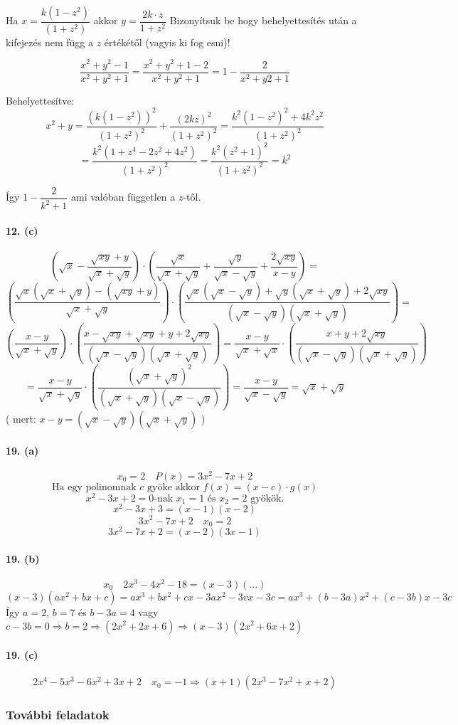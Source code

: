 \documentclass[12pt,a4paper,fleqn]{article}
\newcommand{\myparagraph}[1]{\paragraph{#1}\mbox{}}
\begin{document}
Ha $x = \dfrac{k(1-z^2)}{(1+z^2)}$ akkor $y = \dfrac{2k \cdot z}{1+z^2}$
Bizonyítsuk be hogy behelyettesítés után a kifejezés nem függ a $z$ értékétől
(vagyis ki fog esni)!

\[ \dfrac{x^2+y^2-1}{x^2+y^2+1} = \dfrac{x^2+y^2+1-2}{x^2+y^2+1} =
  1 - \dfrac{2}{x^2+y2+1} \]

Behelyettesítve:
\[ x^2+y=\dfrac{(k(1-z^2))^2}{(1+z^2)^2} + \dfrac{(2kz)^2}{(1+z^2)^2} =
  \dfrac{k^2(1-z^2)^2+4k^2z^2}{(1+z^2)^2} \]
\[ = \dfrac{k^2(1+z^4-2z^2+4z^2)}{(1+z^2)^2} = \dfrac{k^2(z^2+1)^2}{(1+z^2)^2} = k^2 \]

Így $1-\dfrac{2}{k^2+1}$ ami valóban független a $z$-től.


\myparagraph{12. (c)}
\[ \left(\sqrt{x} - \dfrac{\sqrt{xy}+y}{\sqrt{x}+\sqrt{y}}\right) \cdot
  \left( \dfrac{\sqrt{x}}{\sqrt{x}+\sqrt{y}} + \dfrac{\sqrt{y}}{\sqrt{x}-\sqrt{y}} +
  \dfrac{2\sqrt{xy}}{x-y} \right) = \]
\[
  \left(\dfrac{\sqrt{x}(\sqrt{x}+\sqrt{y})-(\sqrt{xy}+y)}{\sqrt{x} + \sqrt{y}} \right) \cdot
  \left( \dfrac{\sqrt{x}(\sqrt{x}-\sqrt{y})+\sqrt{y}(\sqrt{x}+\sqrt{y})+
  2\sqrt{xy}}{(\sqrt{x}-\sqrt{y})(\sqrt{x}+\sqrt{y})} \right) =
\]
\[ \left( \dfrac{x-y}{\sqrt{x}+\sqrt{y}} \right) \cdot \left(
  \dfrac{x-\sqrt{xy}+\sqrt{xy}+y+2\sqrt{xy}}{(\sqrt{x}-\sqrt{y})(\sqrt{x}+\sqrt{y})} \right) =
  \dfrac{x-y}{\sqrt{x}+\sqrt{x}} \cdot \left( \dfrac{x+y+2\sqrt{xy}}{(\sqrt{x}-
  \sqrt{y})(\sqrt{x}+\sqrt{y})} \right) \]
\[ = \dfrac{x-y}{\sqrt{x}+\sqrt{y}} \cdot \left(
  \dfrac{(\sqrt{x}+\sqrt{y})^2}{(\sqrt{x}+\sqrt{y})(\sqrt{x}-\sqrt{y})} \right) =
  \dfrac{x-y}{\sqrt{x} - \sqrt{y}} = \sqrt{x} + \sqrt{y} \]
( mert: $x-y=(\sqrt{x}-\sqrt{y})(\sqrt{x}+\sqrt{y})$ )


\myparagraph{19. (a)}
\[ x_0 = 2 \quad P(x)=3x^2 - 7x + 2 \]
\[ \text{Ha egy polinomnak } c \text{ gyöke akkor } f(x)=(x-c) \cdot g(x) \]
\[ x^2-3x+2=0\text{-nak } x_1=1 \text{ és } x_2=2 \text{ gyökök.} \]
\[ x^2-3x+3=(x-1)(x-2) \]
\[ 3x^2-7x+2 \quad x_0=2 \]
\[ 3x^2-7x+2=(x-2)(3x-1) \]


\myparagraph{19. (b)}
\[ x_0 \quad 2x^3-4x^2-18 = (x-3)(...) \]
\[ (x-3)(ax^2+bx+c) = ax^3+bx^2+cx-3ax^2-3vx-3c = ax^3+(b-3a)x^2+(c-3b)x-3c \]
Így $a=2$, $b=7$ és $b-3a=4$ vagy $c-3b=0 \Rightarrow b=2 \Longrightarrow
  (2x^2+2x+6) \Rightarrow (x-3)(2x^2+6x+2)$


\myparagraph{19. (c)}
\[ 2x^4-5x^3-6x^2+3x+2 \quad x_0=-1 \Longrightarrow (x+1)(2x^3-7x^2+x+2) \]

\subsubsection{További feladatok}
\end{document}
